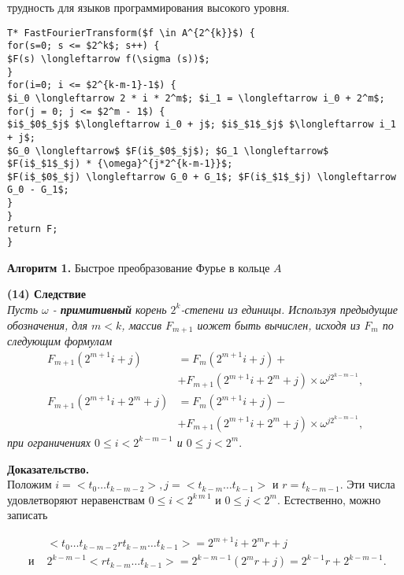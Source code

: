 \documentclass{mai_book}
\begin{document}
трудность для языков программирования высокого уровня.\\
\begin{lstlisting}[mathescape=true]
T* FastFourierTransform($f \in A^{2^{k}}$) {
for(s=0; s <= $2^k$; s++) {
$F(s) \longleftarrow f(\sigma (s))$;
}
for(i=0; i <= $2^{k-m-1}-1$) {
$i_0 \longleftarrow 2 * i * 2^m$; $i_1 = \longleftarrow i_0 + 2^m$;
for(j = 0; j <= $2^m - 1$) {
$i$_$0$_$j$ $\longleftarrow i_0 + j$; $i$_$1$_$j$ $\longleftarrow i_1 + j$;
$G_0 \longleftarrow$ $F(i$_$0$_$j$); $G_1 \longleftarrow$ $F(i$_$1$_$j) * {\omega}^{j*2^{k-m-1}}$;
$F(i$_$0$_$j) \longleftarrow G_0 + G_1$; $F(i$_$1$_$j) \longleftarrow G_0 - G_1$;
}
}
return F;
}
\end{lstlisting}
\begin{center}
\textbf{Алгоритм 1.} Быстрое преобразование Фурье в кольце $A$
\end{center}






\textbf{(14) Следствие}\\
\textit{Пусть $\omega$ - \textbf{примитивный} корень $2^k$-степени из единицы. Используя предыдущие обозначения, для $m<k$, массив $F_{m+1}$ иожет быть вычислен, исходя из $F_m$ по следующим формулам
\begin{equation} 
\begin{split}
F_{m+1}(2^{m+1} i+j) &= F_m (2^{m+1} i+j) + \\
&+F_{m+1}(2^{m+1} i + 2^m +j) \times \omega^{j2^{k-m-1}},\\
F_{m+1}(2^{m+1} i+2^m+j) &= F_m (2^{m+1} i+j) - \\
&+F_{m+1}(2^{m+1} i + 2^m +j) \times \omega^{j2^{k-m-1}},
\end{split}
\end{equation}
при ограничениях $0 \leq i < 2^{k-m-1}$  и $0 \leq j < 2^m.$}

\textbf{Доказательство.}\\
Положим
$ i = < t_0 \ldots t_{k-m-2}>, j = <t_{k-m} \ldots t_{k-1}> $ и $r = t_{k-m-1}$.
Эти числа удовлетворяют неравенствам $0 \leq  i < 2^{k~m~1}$ и $0 \leq j < 2^m$.
Естественно, можно записать

\newpage

\begin{equation}
\begin{split}
&<t_0 \ldots t_{k-m-2} r t_{k-m} \ldots t_{k-1} > = 2^{m+1} i + 2^m r + j \\
\mbox{ и } &2^{k-m-1} <r t_{k-m} \ldots t_{k-1}> = 2^{k-m-1} (2^m r+j) = 2^{k-1} r + 2^{k-m-1}.
\end{split}
\end{equation}
\end{document}
